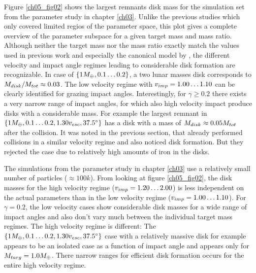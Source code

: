 Figure \ref{ch05_fig02} shows the largest remnants disk mass for the simulation set \css from the parameter study in chapter \ref{ch03}. Unlike the previous studies which only covered limited regios of the parameter space, this plot gives a complete overview of the parameter subspace for a given target mass and mass ratio. Although neither the target mass nor the mass ratio exactly match the values used in previous work and especially the canonical model by \cite{Canup:2001p1861}, the different velocity and impact angle regimes leading to considerable disk formation are recognizable. In case of $\{ 1 M_{\oplus}, 0.1 \dots 0.2 \}$, a two lunar masses disk corresponds to $M_{disk} / M_{tot} \approx 0.03$. The low velocity regime with $v_{imp} = 1.00 \dots 1.10$ can be clearly identified for grazing impact angles. Interestingly, for $\gamma \ge 0.2$ there exists a very narrow range of impact angles, for which also high velocity impact produce disks with a considerable mass. For example the largest remnant in $\{ 1 M_{\oplus}, 0.1 \dots 0.2, 1.30 v_{esc}, 37.5 ^\circ \}$ has a disk with a mass of $M_{disk} \approx 0.05 M_{tot}$ after the collision. It was noted in the previous section, that \cite{Benz:1989p1893} already performed collisions in a similar velocity regime and also noticed disk formation. But they rejected the case due to relatively high amounts of iron in the disks.

The simulations from the parameter study in chapter \ref{ch03} use a relatively small number of particles ($\approx 100k$). From looking at figure \ref{ch05_fig02}, the disk masses for the high velocity regime ($v_{imp} = 1.20 \dots 2.00$) is less independent on the actual parameters than in the low velocity regime ($v_{imp} = 1.00 \dots 1.10$). For $\gamma = 0.2$, the low velocity cases show considerable disk masses for a wide range of impact angles and also don't vary much between the individual target mass regimes. The high velocity regime is different: The $\{ 1 M_{\oplus}, 0.1 \dots 0.2, 1.30 v_{esc}, 37.5 ^\circ \}$ case with a relatively massive disk for example appears to be an isolated case as a function of impact angle and appears only for $M_{targ} = 1.0 M_{\oplus}$. There narrow ranges for efficient disk formation occurs for the entire high velocity regime.

